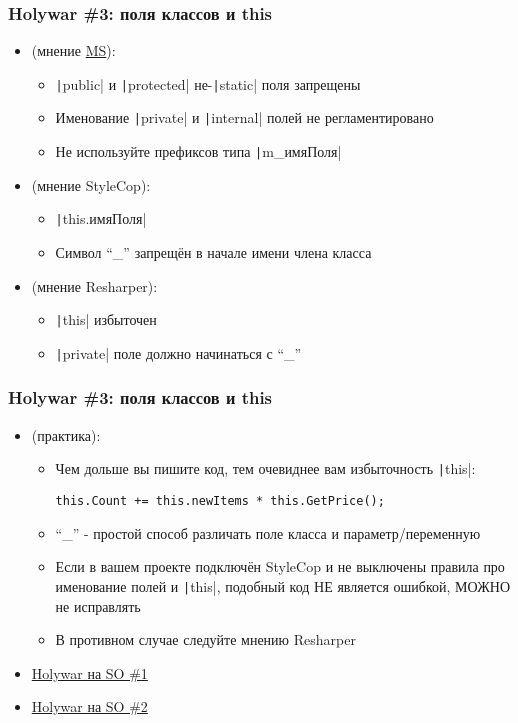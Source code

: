 \documentclass[xetex,mathserif,serif]{beamer}
\begin{document}
	\begin{frame}
		\frametitle{Holywar \#3: поля классов и this}
		\begin{itemize}
			\item (мнение \href{https://docs.microsoft.com/en-us/dotnet/standard/design-guidelines/names-of-type-members\#names-of-fields}{MS}):
			\begin{itemize}
				\item \texttt|public| и \texttt|protected| не-\texttt|static| поля запрещены
				\item Именование \texttt|private| и \texttt|internal| полей не регламентировано
				\item Не используйте префиксов типа \texttt|m_имяПоля|
			\end{itemize}
			\item (мнение StyleCop):
			\begin{itemize}
				\item \texttt|this.имяПоля|
				\item Символ ``\_'' запрещён в начале имени члена класса
			\end{itemize}
			\item (мнение Resharper):
			\begin{itemize}
				\item \texttt|this| избыточен
				\item \texttt|private| поле должно начинаться с ``\_''
			\end{itemize}
		\end{itemize}
	\end{frame}

	\begin{frame}[fragile]
		\frametitle{Holywar \#3: поля классов и this}
		\begin{itemize}
			\item (практика):
			\begin{itemize}
				\item Чем дольше вы пишите код, тем очевиднее вам избыточность \texttt|this|:
					\begin{verbatim}
this.Count += this.newItems * this.GetPrice();
					\end{verbatim}
				\item ``\_'' - простой способ различать поле класса и параметр/переменную
				\item Если в вашем проекте подключён StyleCop и не выключены правила про именование полей и \texttt|this|, подобный код НЕ является ошибкой, МОЖНО не исправлять
				\item В противном случае следуйте мнению Resharper
			\end{itemize}
			\item \href{https://stackoverflow.com/questions/2526346/naming-conventions-for-private-members-of-net-types}{Holywar на SO \#1}
			\item \href{https://stackoverflow.com/questions/4540146/naming-convention-for-private-fields}{Holywar на SO \#2}
		\end{itemize}
	\end{frame}
\end{document}
